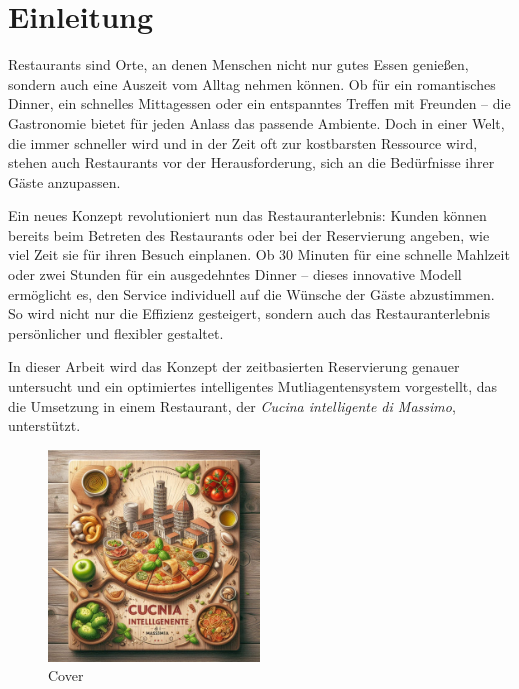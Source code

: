 
\chapter{Einleitung}
\label{chap:einleitung}

Restaurants sind Orte, an denen Menschen nicht nur gutes Essen genießen, sondern auch eine Auszeit vom Alltag nehmen können. Ob für ein romantisches Dinner, ein schnelles Mittagessen oder ein entspanntes Treffen mit Freunden – die Gastronomie bietet für jeden Anlass das passende Ambiente. Doch in einer Welt, die immer schneller wird und in der Zeit oft zur kostbarsten Ressource wird, stehen auch Restaurants vor der Herausforderung, sich an die Bedürfnisse ihrer Gäste anzupassen.

Ein neues Konzept revolutioniert nun das Restauranterlebnis: Kunden können bereits beim Betreten des Restaurants oder bei der Reservierung angeben, wie viel Zeit sie für ihren Besuch einplanen. Ob 30 Minuten für eine schnelle Mahlzeit oder zwei Stunden für ein ausgedehntes Dinner – dieses innovative Modell ermöglicht es, den Service individuell auf die Wünsche der Gäste abzustimmen. So wird nicht nur die Effizienz gesteigert, sondern auch das Restauranterlebnis persönlicher und flexibler gestaltet.

In dieser Arbeit wird das Konzept der zeitbasierten Reservierung genauer untersucht und ein optimiertes intelligentes Mutliagentensystem vorgestellt, das die Umsetzung in einem Restaurant, der \emph{Cucina intelligente di Massimo}, unterstützt.

\begin{figure}[h]
    \centering
    \includegraphics[width=0.5\textwidth]{img/cover.jpg}
    \caption{Cover}
    \label{fig:cover}
\end{figure}

